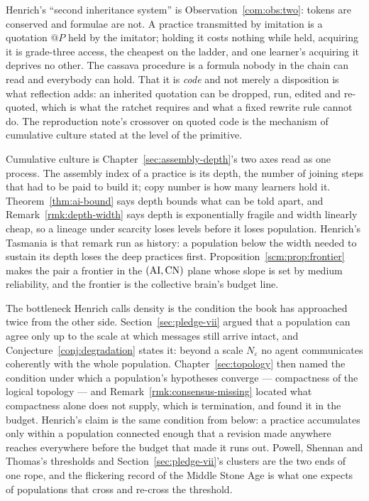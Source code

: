 \begin{observation}
\label{st:obs:nonrival}
Henrich's ``second inheritance system'' is Observation~\ref{com:obs:two}: tokens are conserved and formulae are not. A practice transmitted by imitation is a quotation $@P$ held by the imitator; holding it costs nothing while held, acquiring it is grade-three access, the cheapest on the ladder, and one learner's acquiring it deprives no other. The cassava procedure is a formula nobody in the chain can read and everybody can hold. That it is \emph{code} and not merely a disposition is what reflection adds: an inherited quotation can be dropped, run, edited and re-quoted, which is what the ratchet requires and what a fixed rewrite rule cannot do. The reproduction note's crossover on quoted code is the mechanism of cumulative culture stated at the level of the primitive.
\end{observation}

\begin{observation}
\label{st:obs:ratchet}
Cumulative culture is Chapter~\ref{sec:assembly-depth}'s two axes read as one process. The assembly index of a practice is its depth, the number of joining steps that had to be paid to build it; copy number is how many learners hold it. Theorem~\ref{thm:ai-bound} says depth bounds what can be told apart, and Remark~\ref{rmk:depth-width} says depth is exponentially fragile and width linearly cheap, so a lineage under scarcity loses levels before it loses population. Henrich's Tasmania is that remark run as history: a population below the width needed to sustain its depth loses the deep practices first. Proposition~\ref{scm:prop:frontier} makes the pair a frontier in the $(\mathrm{AI},\mathrm{CN})$ plane whose slope is set by medium reliability, and the frontier is the collective brain's budget line.
\end{observation}

\begin{observation}
\label{st:obs:density}
The bottleneck Henrich calls density is the condition the book has approached twice from the other side. Section~\ref{sec:pledge-vii} argued that a population can agree only up to the scale at which messages still arrive intact, and Conjecture~\ref{conj:degradation} states it: beyond a scale $N_\varepsilon$ no agent communicates coherently with the whole population. Chapter~\ref{sec:topology} then named the condition under which a population's hypotheses converge --- compactness of the logical topology --- and Remark~\ref{rmk:consensus-missing} located what compactness alone does not supply, which is termination, and found it in the budget. Henrich's claim is the same condition from below: a practice accumulates only within a population connected enough that a revision made anywhere reaches everywhere before the budget that made it runs out. Powell, Shennan and Thomas's thresholds and Section~\ref{sec:pledge-vii}'s clusters are the two ends of one rope, and the flickering record of the Middle Stone Age is what one expects of populations that cross and re-cross the threshold.
\end{observation}

